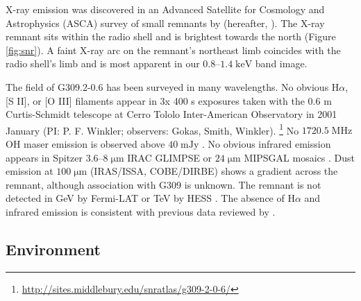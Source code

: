 \documentclass[preprint2,tighten,trackchanges]{aastex6}
\newcommand*{\mt}{\mathrm}
\newcommand*{\unit}[1]{\;\mt{#1}}  %
\begin{document}

X-ray emission was discovered in an Advanced Satellite for Cosmology and
Astrophysics (ASCA) survey of small remnants by \citet{rakowski2001}
(hereafter, ).
The X-ray remnant sits within the radio shell and is brightest towards the
north (Figure \ref{fig:snr}).
A faint X-ray arc on the remnant's northeast limb coincides with the radio
shell's limb and is most apparent in our $0.8$--$1.4 \unit{keV}$ band image.

The field of G309.2-0.6 has been surveyed in many wavelengths.
No obvious H$\alpha$, [S II], or [O III] filaments appear in 3x 400 s exposures
taken with the 0.6 m Curtis-Schmidt telescope at Cerro Tololo Inter-American
Observatory in 2001 January (PI: P. F. Winkler; observers: Gokas, Smith,
Winkler).
\footnote{\url{http://sites.middlebury.edu/snratlas/g309-2-0-6/}}
No $1720.5 \unit{MHz}$ OH maser emission is observed above $40 \unit{mJy}$
\citep{green1997}.
No obvious infrared emission appears in Spitzer
$3.6$--$8 \unit{{\mu}m}$ IRAC GLIMPSE or $24 \unit{{\mu}m}$ MIPSGAL mosaics
\citep{churchwell2009, carey2009}.
Dust emission at $100 \unit{{\mu}m}$ (IRAS/ISSA, COBE/DIRBE) shows a
gradient across the remnant, although association with G309 is unknown.
The remnant is not detected in GeV by Fermi-LAT \citep{acero2016} or TeV by
HESS \citep{bochow2011}.
The absence of H$\alpha$ and infrared emission is consistent with previous
data reviewed by .


\subsection{Environment}
\end{document}
